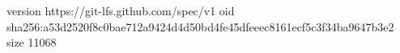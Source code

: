 version https://git-lfs.github.com/spec/v1
oid sha256:a53d2520f8c0bae712a9424d4d50bd4fe45dfeeec8161ecf5c3f34ba9647b3e2
size 11068
